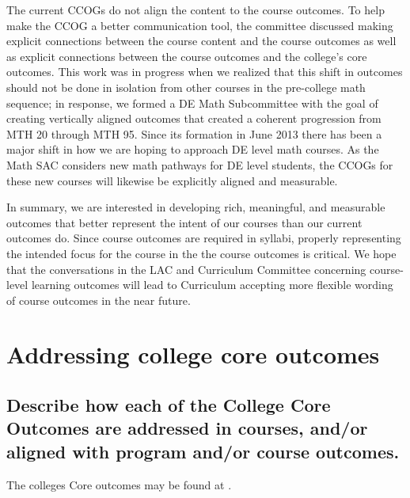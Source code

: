 The current CCOGs do not align the content to the course outcomes. To help
make the CCOG a better communication tool, the committee discussed making
explicit connections between the course content and the course outcomes as well
as explicit connections between the course outcomes and the college's core
outcomes.  This work was in progress when we realized that this shift in
outcomes should not be done in isolation from other courses in the pre-college
math sequence; in response, we formed a DE Math Subcommittee with the goal of
creating vertically aligned outcomes that created a coherent progression from
MTH 20 through MTH 95.  Since its formation in June 2013 there has been a major
shift in how we are hoping to approach DE level math courses.  As the Math SAC
considers new math pathways for DE level students, the CCOGs for these new
courses will likewise be explicitly aligned and measurable.

In summary, we are interested in developing rich, meaningful, and measurable
outcomes that better represent the intent of our courses than our current
outcomes do. Since course outcomes are required in syllabi, properly
representing the intended focus for the course in the the course outcomes is
critical. We hope that the conversations in the LAC and Curriculum Committee
concerning course-level learning outcomes will lead to Curriculum accepting more
flexible wording of course outcomes in the near future.


\section{Addressing college core outcomes}

\subsection[Outcomes in courses and the math program]{Describe how each of the
	College Core Outcomes are addressed in courses, and/or aligned with program
and/or course outcomes.}

The colleges Core outcomes may be found at \cite{coreoutcomes}.

